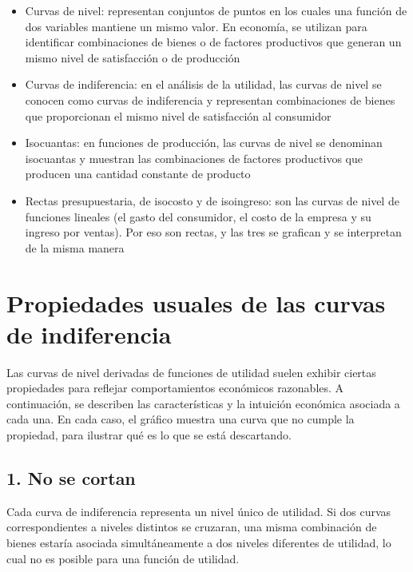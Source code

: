 \documentclass{article}
\begin{document}
\begin{itemize}
    \item {\color{teal}Curvas de nivel:} representan conjuntos de puntos en los cuales una función de dos variables mantiene un mismo valor. En economía, se utilizan para identificar {\color{teal}combinaciones de bienes o de factores productivos que generan un mismo nivel de satisfacción o de producción}

    \item {\color{teal}Curvas de indiferencia:} en el análisis de la utilidad, las curvas de nivel se conocen como curvas de indiferencia y representan {\color{teal}combinaciones de bienes que proporcionan el mismo nivel de satisfacción al consumidor}

    \item {\color{teal}Isocuantas:} en funciones de producción, las curvas de nivel se denominan isocuantas y muestran las {\color{teal}combinaciones de factores productivos que producen una cantidad constante de producto}

    \item {\color{teal}Rectas presupuestaria, de isocosto y de isoingreso:} son las curvas de nivel de funciones lineales (el gasto del consumidor, el costo de la empresa y su ingreso por ventas). Por eso son rectas, y las tres {\color{teal}se grafican y se interpretan de la misma manera}
\end{itemize}


\section*{Propiedades usuales de las curvas de indiferencia}

Las curvas de nivel derivadas de funciones de utilidad suelen exhibir ciertas propiedades para reflejar comportamientos económicos razonables. A continuación, se describen las características y la intuición económica asociada a cada una. En cada caso, el gráfico muestra una curva que {\color{teal}no cumple} la propiedad, para ilustrar qué es lo que se está descartando.

\subsection*{1. No se cortan}

Cada curva de indiferencia representa un {\color{teal}nivel único de utilidad}. Si dos curvas correspondientes a niveles distintos se cruzaran, una misma combinación de bienes estaría asociada simultáneamente a {\color{teal}dos niveles diferentes de utilidad}, lo cual no es posible para una función de utilidad.
\end{document}
